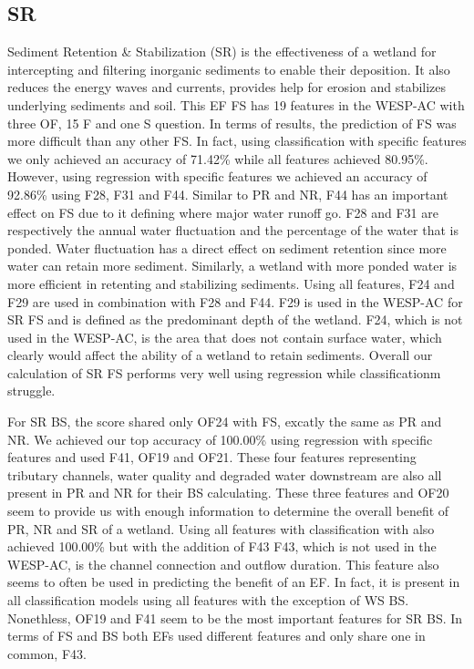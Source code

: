 \documentclass[12pt,letterpaper]{article}
\begin{document}
\subsection{SR}
Sediment Retention \& Stabilization (\ac{SR}) is the effectiveness of a wetland for intercepting and filtering inorganic sediments to enable their deposition.
It also reduces the energy waves and currents, provides help for erosion and stabilizes underlying sediments and soil.
This \ac{EF} \ac{FS} has 19 features in the WESP-AC with three OF, 15 F and one S question.
In terms of results, the prediction of \ac{FS} was more difficult than any other \ac{FS}.
In fact, using classification with specific features we only achieved an accuracy of 71.42\% while all features achieved 80.95\%.
However, using regression with specific features we achieved an accuracy of 92.86\% using F28, F31 and F44.
Similar to \ac{PR} and \ac{NR}, F44 has an important effect on \ac{FS} due to it defining where major water runoff go.
F28 and F31 are respectively the annual water fluctuation and the percentage of the water that is ponded.
Water fluctuation has a direct effect on sediment retention since more water can retain more sediment.
Similarly, a wetland with more ponded water is more efficient in retenting and stabilizing sediments.
Using all features, F24 and F29 are used in combination with F28 and F44.
F29 is used in the WESP-AC for \ac{SR} \ac{FS} and is defined as the predominant depth of the wetland.
F24, which is not used in the WESP-AC, is the area that does not contain surface water, which clearly would affect the ability of a wetland to retain sediments.
Overall our calculation of \ac{SR} \ac{FS} performs very well using regression while classificationm struggle.

For \ac{SR} \ac{BS}, the score shared only OF24 with \ac{FS}, excatly the same as \ac{PR} and \ac{NR}.
We achieved our top accuracy of 100.00\% using regression with specific features and used F41, OF19 and OF21.
These four features representing tributary channels, water quality and degraded water downstream are also all present in \ac{PR} and \ac{NR} for their \ac{BS} calculating.
These three features and OF20 seem to provide us with enough information to determine the overall benefit of \ac{PR}, \ac{NR} and \ac{SR} of a wetland.
Using all features with classification with also achieved 100.00\% but with the addition of F43
F43, which is not used in the WESP-AC, is the channel connection and outflow duration.
This feature also seems to often be used in predicting the benefit of an \ac{EF}.
In fact, it is present in all classification models using all features with the exception of \ac{WS} \ac{BS}.
Nonethless, OF19 and F41 seem to be the most important features for \ac{SR} \ac{BS}.
In terms of \ac{FS} and \ac{BS} both \ac{EF}s used different features and only share one in common, F43.
\end{document}
